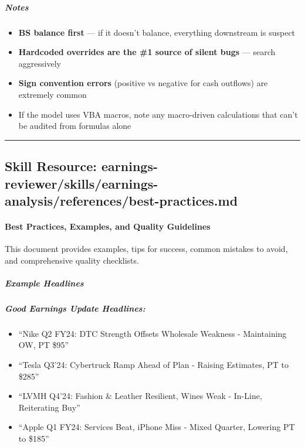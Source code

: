 \documentclass[11pt]{article}
\begin{document}
\subparagraph{Notes}\mbox{}\par

\begin{itemize}[leftmargin=*,itemsep=2pt,topsep=2pt]
\item {} \textbf{BS balance first} — if it doesn't balance, everything downstream is suspect
\item {} \textbf{Hardcoded overrides are the \#1 source of silent bugs} — search aggressively
\item {} \textbf{Sign convention errors} (positive vs negative for cash outflows) are extremely common
\item {} If the model uses VBA macros, note any macro-driven calculations that can't be audited from formulas alone
\end{itemize}

\vspace{0.8em}\hrule\vspace{0.8em}

\subsection{Skill Resource: earnings-reviewer/skills/earnings-analysis/references/best-practices.md}\label{file:earnings-reviewer-skills-earnings-analysis-references-best-practices-md}

\paragraph{Best Practices, Examples, and Quality Guidelines}\mbox{}\par

This document provides examples, tips for success, common mistakes to avoid, and comprehensive quality checklists.


\subparagraph{Example Headlines}\mbox{}\par

\subparagraph{Good Earnings Update Headlines:}\mbox{}\par
\begin{itemize}[leftmargin=*,itemsep=2pt,topsep=2pt]
\item {} ``Nike Q2 FY24: DTC Strength Offsets Wholesale Weakness - Maintaining OW, PT \$95''
\item {} ``Tesla Q3'24: Cybertruck Ramp Ahead of Plan - Raising Estimates, PT to \$285''
\item {} ``LVMH Q4'24: Fashion \& Leather Resilient, Wines Weak - In-Line, Reiterating Buy''
\item {} ``Apple Q1 FY24: Services Beat, iPhone Miss - Mixed Quarter, Lowering PT to \$185''
\end{itemize}
\end{document}
